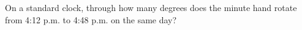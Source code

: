 On a standard clock, through how many degrees does the minute hand rotate from 4:12 p.m. to 4:48 p.m. on the same day?
